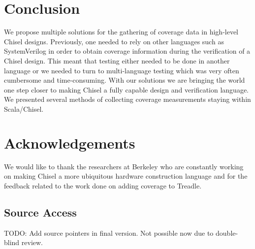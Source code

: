 \documentclass[runningheads]{llncs}
\newcommand{\todo}[1]{{\color{olive} TODO: #1}}
\begin{document}
\section{Conclusion}
We propose multiple solutions for the gathering of coverage data in high-level Chisel designs. Previously, one needed to rely on other languages such as SystemVerilog in order to obtain coverage information during the verification of a Chisel design. This meant that testing either needed to be done in another language or we needed to turn to multi-language testing which was very often cumbersome and time-consuming. With our solutions we are bringing the world one step closer to making Chisel a fully capable design and verification language.
We presented several methods of collecting coverage measurements staying within Scala/Chisel.

\section*{Acknowledgements}
We would like to thank the researchers at Berkeley who are constantly working on making Chisel a more ubiquitous hardware construction language and for the feedback related to the work done on adding coverage to Treadle.

\subsection*{Source Access}

\todo{Add source pointers in final version. Not possible now due to double-blind review.}



\end{document}
